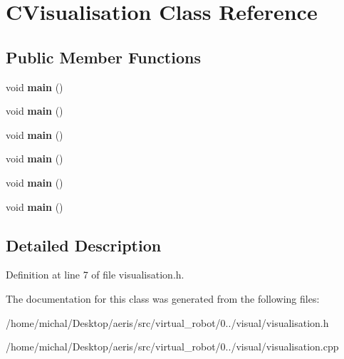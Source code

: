 \hypertarget{classCVisualisation}{\section{C\-Visualisation Class Reference}
\label{classCVisualisation}
}
\subsection*{Public Member Functions}
\begin{DoxyCompactItemize}
\item 
\hypertarget{classCVisualisation_acd7ed3b78080707aba0c158349636ad8}{void {\bfseries main} ()}\label{classCVisualisation_acd7ed3b78080707aba0c158349636ad8}

\item 
\hypertarget{classCVisualisation_acd7ed3b78080707aba0c158349636ad8}{void {\bfseries main} ()}\label{classCVisualisation_acd7ed3b78080707aba0c158349636ad8}

\item 
\hypertarget{classCVisualisation_acd7ed3b78080707aba0c158349636ad8}{void {\bfseries main} ()}\label{classCVisualisation_acd7ed3b78080707aba0c158349636ad8}

\item 
\hypertarget{classCVisualisation_acd7ed3b78080707aba0c158349636ad8}{void {\bfseries main} ()}\label{classCVisualisation_acd7ed3b78080707aba0c158349636ad8}

\item 
\hypertarget{classCVisualisation_acd7ed3b78080707aba0c158349636ad8}{void {\bfseries main} ()}\label{classCVisualisation_acd7ed3b78080707aba0c158349636ad8}

\item 
\hypertarget{classCVisualisation_acd7ed3b78080707aba0c158349636ad8}{void {\bfseries main} ()}\label{classCVisualisation_acd7ed3b78080707aba0c158349636ad8}

\end{DoxyCompactItemize}


\subsection{Detailed Description}


Definition at line 7 of file visualisation.\-h.



The documentation for this class was generated from the following files\-:\begin{DoxyCompactItemize}
\item 
/home/michal/\-Desktop/aeris/src/virtual\-\_\-robot/0../visual/visualisation.\-h\item 
/home/michal/\-Desktop/aeris/src/virtual\-\_\-robot/0../visual/visualisation.\-cpp\end{DoxyCompactItemize}
